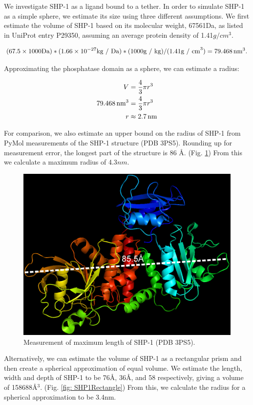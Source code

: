 \documentclass[../../AdvancementSummary.tex]{subfiles}
\begin{document}
We investigate SHP-1 as a ligand bound to a tether. In order to simulate SHP-1 as a simple sphere, we estimate its size using three different assumptions. We first estimate the volume of SHP-1 based on its molecular weight, 67561Da,  as listed in UniProt entry P29350, assuming an average protein density of 1.41$g/cm^3$. \cite{Fischer2004}


\begin{equation*}
(67.5 \times 1000 \mbox{Da}) * (1.66\times10^{-27} \mbox{kg / Da}) * (1000 \mbox{g / kg}) / (1.41 \mbox{g / cm}^3) = 79.468 \,\mbox{nm}^3.
\end{equation*}

Approximating the phosphatase domain as a sphere, we can estimate a radius: 

\begin{align*}
V &= \frac{4}{3}\pi r^3 \\
79.468 \,\mbox{nm}^3 &= \frac{4}{3} \pi r^3 \\
r &\approx 2.7 \,\mbox{nm} \\
\end{align*}

For comparison, we also estimate an upper bound on the radius of SHP-1 from PyMol measurements of the SHP-1 structure (PDB 3PS5). Rounding up for measurement error, the longest part of the structure is 86 \AA. (Fig. \ref{fig: SHP1Diag}) From this we calculate a maximum radius of 4.3$nm$.

\begin{figure}[H]
\begin{center}
\includegraphics[width=0.5\linewidth]{ResultsFigures/SHP1PyMol/Diagonal1.eps}
\end{center}
\caption{Measurement of maximum length of SHP-1 (PDB 3PS5). \label{fig: SHP1Diag}}
\end{figure}

Alternatively, we can estimate the volume of SHP-1 as a rectangular prism and then create a spherical approximation of equal volume. We estimate the length, width and depth of SHP-1 to be 76\AA, 36\AA, and 58\text{\AA} respectively, giving a volume of 158688\AA$^3$. (Fig. \ref{fig: SHP1Rectangle}) From this, we calculate the radius for a spherical approximation to be 3.4nm.
\end{document}
